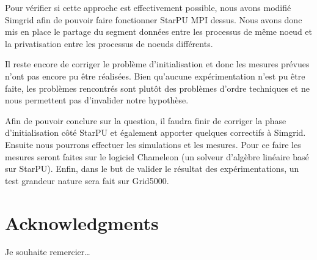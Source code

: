 \documentclass[smallextended]{svjour3}
\begin{document}
Pour vérifier si cette approche est effectivement possible, nous
avons modifié Simgrid afin de pouvoir faire fonctionner StarPU MPI
dessus. Nous avons donc mis en place le partage du segment données
entre les processus de même noeud et la privatisation entre les
processus de noeuds différents. 

Il reste encore de corriger le problème d'initialisation et donc les
mesures prévues n'ont pas encore pu être réalisées. Bien qu'aucune
expérimentation n'est pu être faite, les problèmes rencontrés sont
plutôt des problèmes d'ordre techniques et ne nous permettent pas
d'invalider notre hypothèse. 

Afin de pouvoir conclure sur la question, il faudra finir de
corriger la phase d'initialisation côté StarPU et également apporter
quelques correctifs à Simgrid. Ensuite nous pourrons effectuer les
simulations et les mesures. Pour ce faire les mesures seront faites
sur le logiciel Chameleon (un solveur d'algèbre linéaire basé sur
StarPU). Enfin, dans le but de valider le résultat des
expérimentations, un test grandeur nature sera fait sur Grid5000.


\section*{Acknowledgments}
Je souhaite remercier\ldots{}

\nocite{*}
\def\raggedright{}


\end{document}
